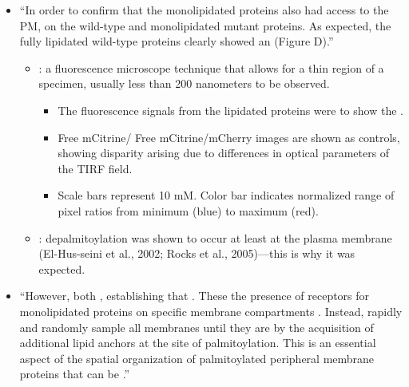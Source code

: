 \documentclass[basic,plain]{inVerba-notes}
\begin{document}
\begin{itemize}
  \item  ``In order to confirm that the monolipidated
  proteins also had access to the PM,  on the wild-type and monolipidated mutant proteins.
  As expected, the fully lipidated wild-type proteins clearly
  showed an  (Figure D).''
    \begin{itemize}
      \item {}: a fluorescence microscope technique that allows for a thin region of a specimen, usually less than 200 nanometers to be observed. 
        \begin{itemize}
          \item The fluorescence signals from the lipidated proteins were  to show the .
          \item Free mCitrine/ Free mCitrine/mCherry images are shown as controls, showing disparity arising due to differences in optical parameters of the TIRF field.
          \item Scale bars represent 10 mM. Color bar indicates normalized range of pixel ratios from minimum (blue) to maximum (red).
        \end{itemize}
      \item {}: depalmitoylation was shown to occur at least at the plasma membrane (El-Hus-seini et al., 2002; Rocks et al., 2005)---this is why it was expected. 
    \end{itemize}
    \item ``However, both , establishing that . These  the presence of receptors for monolipidated proteins on specific membrane compartments . Instead,  rapidly and randomly sample all membranes until they are  by the acquisition of additional lipid anchors at the site of palmitoylation. This  is an essential aspect of the spatial organization of palmitoylated peripheral membrane proteins that can be .''
      \begin{itemize}

\end{itemize}
\end{itemize}
\end{document}

